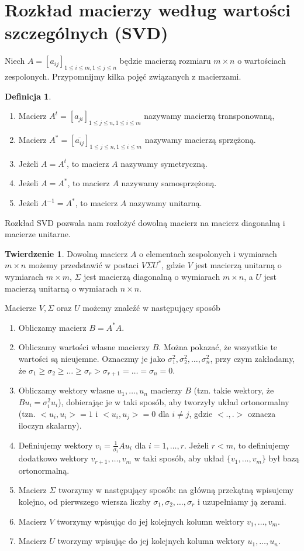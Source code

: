 \documentclass[12pt,a4paper]{article}
\theoremstyle{definition}
\newtheorem{twie}{Twierdzenie}
\newtheorem{de}{Definicja}
\begin{document}
\newpage
	\section*{Rozkład macierzy według wartości szczególnych (SVD)}
	Niech $A=[a_{ij}]_{1\leq i\leq m,1\leq j\leq n}$ będzie macierzą rozmiaru $m\times n$ o wartościach zespolonych. Przypomnijmy kilka pojęć związanych z macierzami.
	\begin{de}
		\begin{enumerate}
			\item Macierz $A^t=[a_{ji}]_{1\leq j\leq n,1\leq i\leq m}$ nazywamy macierzą transponowaną,
			\item Macierz $A^*=[\overline{a_{ij}}]_{1\leq j\leq n,1\leq i\leq m}$ nazywamy macierzą sprzężoną.
			\item Jeżeli $A=A^t$, to macierz $A$ nazywamy symetryczną.
			\item Jeżeli $A=A^*$, to macierz $A$ nazywamy samosprzężoną.
			\item Jeżeli $A^{-1}=A^*$, to macierz $A$ nazywamy unitarną.
		\end{enumerate}
	\end{de}
	Rozkład SVD pozwala nam rozłożyć dowolną macierz na macierz diagonalną i macierze unitarne.
	\begin{twie}
		Dowolną macierz $A$ o elementach zespolonych i wymiarach $m\times n$ możemy przedstawić w postaci $V\Sigma U^*$, gdzie $V$ jest macierzą unitarną o wymiarach $m\times m$, $\Sigma$ jest macierzą diagonalną o wymiarach $m\times n$, a $U$ jest macierzą unitarną o wymiarach $n\times n$.
	\end{twie}
	Macierze $V,\Sigma$ oraz $U$ możemy znale\'zć w następujący sposób
	\begin{enumerate}
		\item Obliczamy macierz $B=A^*A$.
		\item Obliczamy wartości własne macierzy $B$. Można pokazać, że wszystkie te wartości są nieujemne. Oznaczmy je jako $\sigma_1^2,\sigma_2^2,\ldots,\sigma_n^2$, przy czym zakładamy, że $\sigma_1\geq \sigma_2\geq \ldots \geq \sigma_r>\sigma_{r+1}=\ldots=\sigma_n=0$.
		\item Obliczamy wektory własne $u_1,\ldots,u_n$ macierzy $B$ (tzn. takie wektory, że $Bu_i=\sigma_i^2u_i$), dobierając je w taki sposób, aby tworzyły układ ortonormalny (tzn. $<u_i,u_i>=1$ i $<u_i,u_j>=0$ dla $i\neq j$, gdzie $<.,.>$ oznacza iloczyn skalarny).
		\item Definiujemy wektory $v_i=\frac{1}{\sigma_i}Au_i$ dla $i=1,\ldots,r$. Jeżeli $r<m$, to definiujemy dodatkowo wektory $v_{r+1},\ldots,v_m$ w taki sposób, aby układ $\{v_1,\ldots,v_m\}$ był bazą ortonormalną.
		\item Macierz $\Sigma$ tworzymy w następujący sposób: na główną przekątną wpisujemy kolejno, od pierwszego wiersza liczby $\sigma_1,\sigma_2,\ldots,\sigma_r$ i uzupełniamy ją zerami.
		\item Macierz $V$ tworzymy wpisując do jej kolejnych kolumn wektory $v_1,\ldots,v_m$.
		\item Macierz $U$ tworzymy wpisując do jej kolejnych kolumn wektory $u_1,\ldots,u_n$.
	\end{enumerate}
\end{document}

